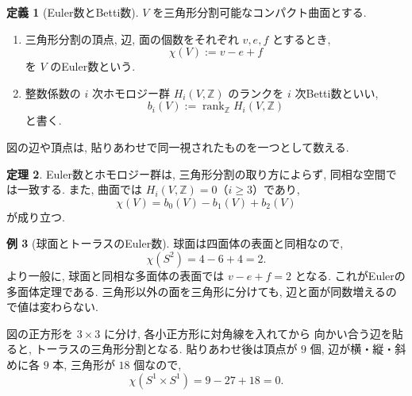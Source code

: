 \documentclass[dvipdfmx,a4paper,11pt]{article} %
\newcommand{\Z}{\mathbb{Z}}
\theoremstyle{definition}
\newtheorem{thm}{定理}[section]
\numberwithin{equation}{section}
\newtheorem{dfn}[thm]{定義}
\newtheorem{exa}[thm]{例}
\begin{document}
\begin{dfn}[Euler数とBetti数]
$V$ を三角形分割可能なコンパクト曲面とする.
\begin{enumerate}
\item
三角形分割の頂点, 辺, 面の個数をそれぞれ $v,e,f$ とするとき, 
\[
\chi(V):=v-e+f
\]
を $V$ のEuler数という.

\item
整数係数の $i$ 次ホモロジー群 $H_i(V,\Z)$ のランクを
$i$ 次Betti数といい, 
\[
b_i(V):=\operatorname{rank}_{\Z}H_i(V,\Z)
\]
と書く.
\end{enumerate}
\end{dfn}

\begin{center}
\end{center}
図の辺や頂点は, 貼りあわせで同一視されたものを一つとして数える.

\begin{thm}
Euler数とホモロジー群は, 三角形分割の取り方によらず, 
同相な空間では一致する.
また, 曲面では $H_i(V,\Z)=0$（$i\geq3$）であり, 
\[
\chi(V)=b_0(V)-b_1(V)+b_2(V)
\]
が成り立つ.
\end{thm}

\begin{exa}[球面とトーラスのEuler数]
球面は四面体の表面と同相なので,
\[
\chi(S^2)=4-6+4=2.
\]
より一般に, 球面と同相な多面体の表面では
$v-e+f=2$ となる. これがEulerの多面体定理である.
三角形以外の面を三角形に分けても, 辺と面が同数増えるので値は変わらない.

図の正方形を $3\times3$ に分け, 各小正方形に対角線を入れてから
向かい合う辺を貼ると, トーラスの三角形分割となる.
貼りあわせ後は頂点が $9$ 個, 辺が横・縦・斜めに各 $9$ 本,
三角形が $18$ 個なので,
\[
\chi(S^1\times S^1)=9-27+18=0.
\]
\end{exa}
\end{document}
